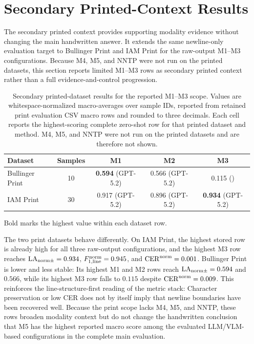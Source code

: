 \section{Secondary Printed-Context Results}
\label{sec:experimentation_print_results}

The secondary printed context provides supporting modality evidence without changing the main handwritten answer. It extends the same newline-only evaluation target to Bullinger Print and IAM Print for the raw-output M1--M3 configurations. Because M4, M5, and NNTP were not run on the printed datasets, this section reports limited M1--M3 rows as secondary printed context rather than a full evidence-and-control progression.

\begin{table}[H]
  \centering
  \caption{Secondary printed-dataset results for the reported M1--M3 scope. Values are whitespace-normalized \LANormCombined{} macro-averages over sample IDs, reported from retained print evaluation CSV macro rows and rounded to three decimals. Each cell reports the highest-scoring complete zero-shot row for that printed dataset and method. M4, M5, and NNTP were not run on the printed datasets and are therefore not shown.}
  \label{tab:exp_print_secondary}
  \footnotesize
  \renewcommand{\arraystretch}{1.08}
  \begin{tabular}{@{}l c c c c@{}}
    \toprule
    \textbf{Dataset} & \textbf{Samples} & \textbf{M1} & \textbf{M2} & \textbf{M3} \\
    \midrule
    Bullinger Print & 10 & \textbf{0.594} (GPT-5.2) & 0.566 (GPT-5.2) & 0.115 (\MistralLargeShort{}) \\
    IAM Print & 30 & 0.917 (GPT-5.2) & 0.896 (GPT-5.2) & \textbf{0.934} (GPT-5.2) \\
    \bottomrule
  \end{tabular}
  \vspace{0.35em}

  \parbox{0.74\linewidth}{\footnotesize Bold marks the highest value within each dataset row.}
\end{table}

The two print datasets behave differently. On IAM Print, the highest stored row is already high for all three raw-output configurations, and the highest M3 row reaches \(\mathrm{LA}_{\mathrm{norm}\pm}=0.934\), \(F_{1,\mathrm{line}}^{\mathrm{norm}}=0.945\), and \(\mathrm{CER}^{\mathrm{norm}}=0.001\). Bullinger Print is lower and less stable: Its highest M1 and M2 rows reach \(\mathrm{LA}_{\mathrm{norm}\pm}=0.594\) and \(0.566\), while its highest M3 row falls to \(0.115\) despite \(\mathrm{CER}^{\mathrm{norm}}=0.009\). This reinforces the line-structure-first reading of the metric stack: Character preservation or low CER does not by itself imply that newline boundaries have been recovered well. Because the print scope lacks M4, M5, and NNTP, these rows broaden modality context but do not change the handwritten conclusion that M5 has the highest reported macro score among the evaluated LLM/VLM-based configurations in the complete main evaluation.

